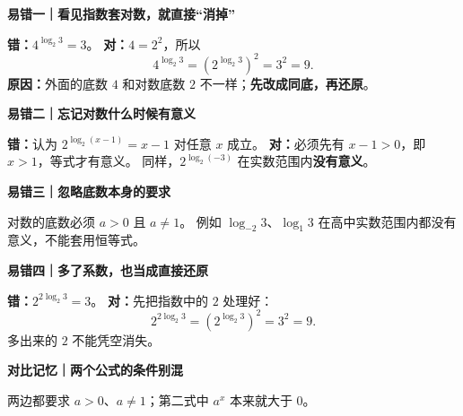 \begin{trapbox}
	\textbf{\textcolor{CTrap}{易错一｜看见指数套对数，就直接“消掉”}}

	\textbf{错：}$4^{\log_2 3}=3$。
	\textbf{对：}$4=2^2$，所以
	\[
	4^{\log_2 3}=(2^{\log_2 3})^2=3^2=9.
	\]
	\textbf{原因：}外面的底数 $4$ 和对数底数 $2$ 不一样；\textbf{先改成同底，再还原}。

	\medskip
	\textbf{\textcolor{CTrap}{易错二｜忘记对数什么时候有意义}}

	\textbf{错：}认为 $2^{\log_2(x-1)}=x-1$ 对任意 $x$ 成立。
	\textbf{对：}必须先有 $x-1>0$，即 $x>1$，等式才有意义。
	同样，$2^{\log_2(-3)}$ 在实数范围内\textbf{没有意义}。

	\medskip
	\textbf{\textcolor{CTrap}{易错三｜忽略底数本身的要求}}

	对数的底数必须 $a>0$ 且 $a\neq 1$。
	例如 $\log_{-2}3$、$\log_1 3$ 在高中实数范围内都没有意义，不能套用恒等式。

	\medskip
	\textbf{\textcolor{CTrap}{易错四｜多了系数，也当成直接还原}}

	\textbf{错：}$2^{2\log_2 3}=3$。
	\textbf{对：}先把指数中的 $2$ 处理好：
	\[
	2^{2\log_2 3}=(2^{\log_2 3})^2=3^2=9.
	\]
	多出来的 $2$ 不能凭空消失。

	\medskip
	\textbf{\textcolor{CTrap}{对比记忆｜两个公式的条件别混}}
	\begin{center}
	
	\end{center}
	两边都要求 $a>0$、$a\neq 1$；第二式中 $a^x$ 本来就大于 $0$。
\end{trapbox}
